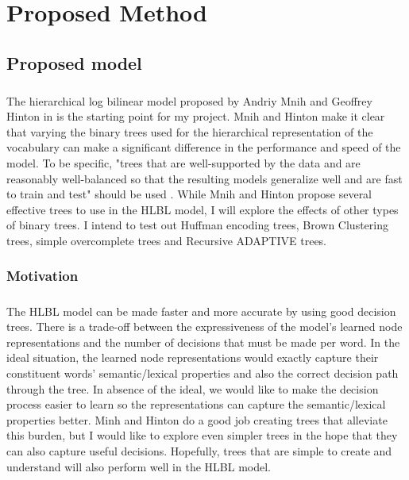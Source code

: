 \documentclass[12pt]{ociamthesis}  %
\begin{document}
\chapter{Proposed Method}

\section{Proposed model} \label{sec:proposedModel}
\paragraph{}
The hierarchical log bilinear model proposed by Andriy Mnih and Geoffrey Hinton in \cite{MnihHinton2009} is the starting point for my project. Mnih and Hinton make it clear that varying the binary trees used for the hierarchical representation of the vocabulary can make a significant difference in the performance and speed of the model. To be specific, "trees
that are well-supported by the data and are reasonably well-balanced so that the resulting models
generalize well and are fast to train and test" should be used \cite[pg. 5]{MnihHinton2009}. While Mnih and Hinton propose several effective trees to use in the HLBL model, I will explore the effects of other types of binary trees. I intend to test out Huffman encoding trees, Brown Clustering trees, simple overcomplete trees and Recursive ADAPTIVE trees.
\subsection{Motivation}
\paragraph{}
The HLBL model can be made faster and more accurate by using good decision trees. There is a trade-off between the expressiveness of the model's learned node representations and the number of decisions that must be made per word. In the ideal situation, the learned node representations would exactly capture their constituent words' semantic/lexical properties and also the correct decision path through the tree. In absence of the ideal, we would like to make the decision process easier to learn so the representations can capture the semantic/lexical properties better. Minh and Hinton do a good job creating trees that alleviate this burden, but I would like to explore even simpler trees in the hope that they can also capture useful decisions. Hopefully, trees that are simple to create and understand will also perform well in the HLBL model. 
\end{document}
